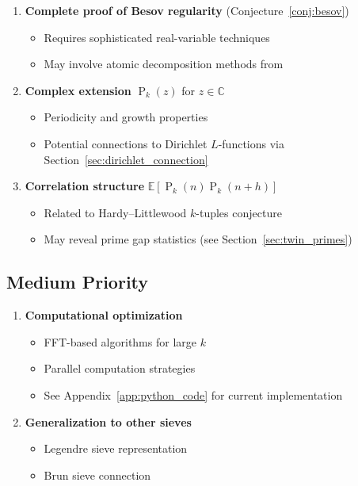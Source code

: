 ﻿\documentclass[12pt,a4paper]{report}
\theoremstyle{plain}
\theoremstyle{definition}
\newcommand{\C}{\mathbb{C}}
\newcommand{\E}{\mathbb{E}}
\DeclareMathOperator{\Pk}{P}
\begin{document}
\begin{enumerate}
    \item \textbf{Complete proof of Besov regularity} (Conjecture~\ref{conj:besov})
    \begin{itemize}
        \item Requires sophisticated real-variable techniques
        \item May involve atomic decomposition methods from \cite{Triebel2006}
    \end{itemize}
    
    \item \textbf{Complex extension} $\Pk_k(z)$ for $z \in \C$
    \begin{itemize}
        \item Periodicity and growth properties
        \item Potential connections to Dirichlet $L$-functions via Section~\ref{sec:dirichlet_connection}
    \end{itemize}
    
    \item \textbf{Correlation structure} $\E[\Pk_k(n)\Pk_k(n+h)]$
    \begin{itemize}
        \item Related to Hardy--Littlewood $k$-tuples conjecture
        \item May reveal prime gap statistics (see Section~\ref{sec:twin_primes})
    \end{itemize}
\end{enumerate}

\subsection*{Medium Priority}

\begin{enumerate}[resume]
    \item \textbf{Computational optimization}
    \begin{itemize}
        \item FFT-based algorithms for large $k$
        \item Parallel computation strategies
        \item See Appendix~\ref{app:python_code} for current implementation
    \end{itemize}
    
    \item \textbf{Generalization to other sieves}
    \begin{itemize}
        \item Legendre sieve representation
        \item Brun sieve connection
    \end{itemize}
\end{enumerate}
\end{document}
